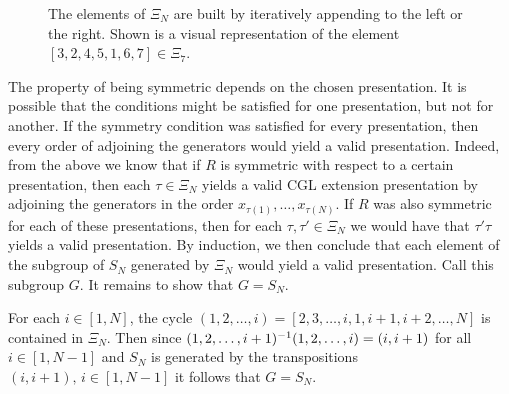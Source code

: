 \begin{figure}
	\centering
	\caption{The elements of $\Xi_N$ are built by iteratively appending to the left or the right. Shown is a visual representation of the element $[3,2,4,5,1,6,7] \in \Xi_7$.}
	\label{fig:mental_picture_Xi_N}
\end{figure}

\begin{remark}

	The property of being symmetric depends on the chosen presentation. It is possible that
	the conditions might be satisfied for one presentation, but not for another. If the
	symmetry condition was satisfied for every presentation, then every order of adjoining
	the generators would yield a valid presentation. Indeed, from the above we know that if
	$R$ is symmetric with respect to a certain presentation, then each $\tau \in \Xi_N$
	yields a valid CGL extension presentation by adjoining the generators in the order
	$x_{\tau(1)}, \dots, x_{\tau(N)}$. If $R$ was also symmetric for each of these
	presentations, then for each $\tau, \tau' \in \Xi_N$ we would have that $\tau'\tau$
	yields a valid presentation. By induction, we then conclude that each element of the
	subgroup of $S_N$ generated by $\Xi_N$ would yield a valid presentation. Call this
	subgroup $G$. It remains to show that $G = S_N$.

	For each $i \in [1, N]$, the cycle $(1,2, \dots, i) = [2,3,\dots,i , 1, i+1, i+2,
		\dots, N]$ is contained in $\Xi_N$. Then since $(1,2, \dots, i+1)^{-1} (1, 2, \dots, i)
		= (i, i+1)$ for all $i \in [1, N-1]$ and $S_N$ is generated by the transpositions $(i,
		i+1),\, i \in [1, N-1]$ it follows that $G = S_N$.
\end{remark}

